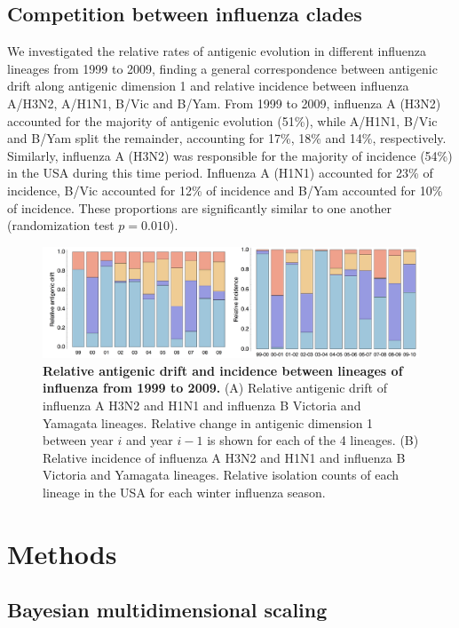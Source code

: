\documentclass[11pt,oneside,letterpaper]{article}
\begin{document}
\subsection*{Competition between influenza clades}

We investigated the relative rates of antigenic evolution in different influenza lineages from 1999 to 2009, finding a general correspondence between antigenic drift along antigenic dimension 1 and relative incidence between influenza A/H3N2, A/H1N1, B/Vic and B/Yam.
From 1999 to 2009, influenza A (H3N2) accounted for the majority of antigenic evolution (51\%), while A/H1N1, B/Vic and B/Yam split the remainder, accounting for 17\%, 18\% and 14\%, respectively.
Similarly, influenza A (H3N2) was responsible for the majority of incidence (54\%) in the USA during this time period.
Influenza A (H1N1) accounted for 23\% of incidence, B/Vic accounted for 12\% of incidence and B/Yam accounted for 10\% of incidence.
These proportions are significantly similar to one another (randomization test $p = 0.010$).


\begin{figure}[tb]
	\centering		
	\includegraphics[width=\textwidth]{figures/incidence}
	\caption{\textbf{Relative antigenic drift and incidence between lineages of influenza from 1999 to 2009.} 
	(A) Relative antigenic drift of influenza A H3N2 and H1N1 and influenza B Victoria and Yamagata lineages.
	Relative change in antigenic dimension 1 between year $i$ and year $i-1$ is shown for each of the 4 lineages.
	(B) Relative incidence of influenza A H3N2 and H1N1 and influenza B Victoria and Yamagata lineages.
	Relative isolation counts of each lineage in the USA for each winter influenza season.
	} 
	\label{incidence} 
\end{figure}

\section*{Methods}

\subsection*{Bayesian multidimensional scaling}
\end{document}
